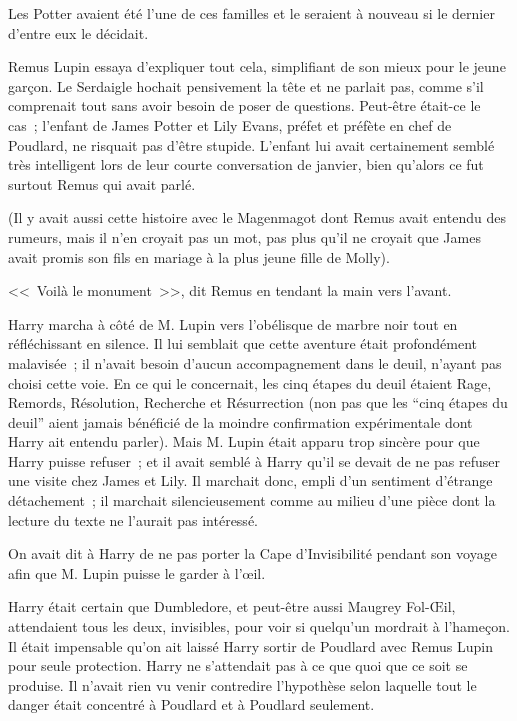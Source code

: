 Les Potter avaient été l'une de ces familles et le seraient à nouveau si le dernier d'entre eux le décidait.

Remus Lupin essaya d'expliquer tout cela, simplifiant de son mieux pour le jeune garçon. Le Serdaigle hochait pensivement la tête et ne parlait pas, comme s'il comprenait tout sans avoir besoin de poser de questions. Peut-être était-ce le cas~; l'enfant de James Potter et Lily Evans, préfet et préfète en chef de Poudlard, ne risquait pas d'être stupide. L'enfant lui avait certainement semblé très intelligent lors de leur courte conversation de janvier, bien qu'alors ce fut surtout Remus qui avait parlé.

(Il y avait aussi cette histoire avec le Magenmagot dont Remus avait entendu des rumeurs, mais il n'en croyait pas un mot, pas plus qu'il ne croyait que James avait promis son fils en mariage à la plus jeune fille de Molly).

<<~Voilà le monument~>>, dit Remus en tendant la main vers l'avant.

\later

Harry marcha à côté de M. Lupin vers l'obélisque de marbre noir tout en réfléchissant en silence. Il lui semblait que cette aventure était profondément malavisée~; il n'avait besoin d'aucun accompagnement dans le deuil, n'ayant pas choisi cette voie. En ce qui le concernait, les cinq étapes du deuil étaient Rage, Remords, Résolution, Recherche et Résurrection (non pas que les “cinq étapes du deuil” aient jamais bénéficié de la moindre confirmation expérimentale dont Harry ait entendu parler). Mais M. Lupin était apparu trop sincère pour que Harry puisse refuser~; et il avait semblé à Harry qu'il se devait de ne pas refuser une visite chez James et Lily. Il marchait donc, empli d'un sentiment d'étrange détachement~; il marchait silencieusement comme au milieu d'une pièce dont la lecture du texte ne l'aurait pas intéressé.

On avait dit à Harry de ne pas porter la Cape d'Invisibilité pendant son voyage afin que M. Lupin puisse le garder à l'œil.

Harry était certain que Dumbledore, et peut-être aussi Maugrey Fol-Œil, attendaient tous les deux, invisibles, pour voir si quelqu'un mordrait à l'hameçon. Il était impensable qu'on ait laissé Harry sortir de Poudlard avec Remus Lupin pour seule protection. Harry ne s'attendait pas à ce que quoi que ce soit se produise. Il n'avait rien vu venir contredire l'hypothèse selon laquelle tout le danger était concentré à Poudlard et à Poudlard seulement.

